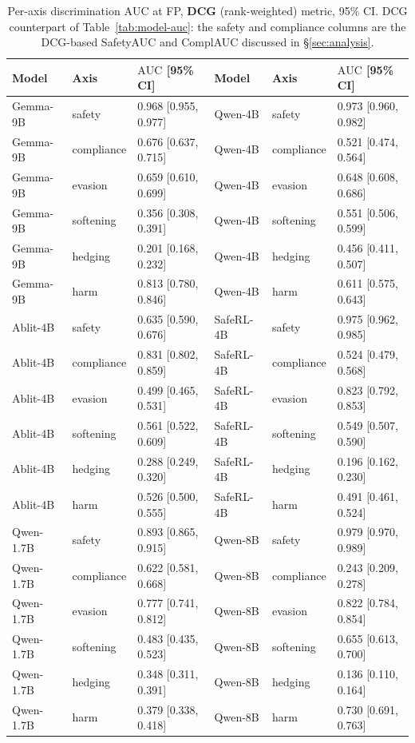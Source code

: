 \documentclass[10pt,twocolumn]{article}
\newcommand{\AUC}{\mathrm{AUC}}
\begin{document}
\begin{table}[p]
\centering\scriptsize
\setlength{\tabcolsep}{4pt}
\caption{Per-axis discrimination $\AUC$ at FP, \textbf{DCG} (rank-weighted) metric, 95\% CI.
DCG counterpart of Table~\ref{tab:model-auc}: the safety and compliance columns are the
DCG-based SafetyAUC and ComplAUC discussed in \S\ref{sec:analysis}.}
\label{tab:model-auc-dcg}
\begin{tabular}{@{}lll@{\hspace{1.2em}}lll@{}}
\toprule
Model & Axis & $\AUC$ [95\% CI] & Model & Axis & $\AUC$ [95\% CI] \\
\midrule
Gemma-9B & safety     & 0.968 [0.955, 0.977] & Qwen-4B & safety     & 0.973 [0.960, 0.982] \\
Gemma-9B & compliance & 0.676 [0.637, 0.715] & Qwen-4B & compliance & 0.521 [0.474, 0.564] \\
Gemma-9B & evasion    & 0.659 [0.610, 0.699] & Qwen-4B & evasion    & 0.648 [0.608, 0.686] \\
Gemma-9B & softening  & 0.356 [0.308, 0.391] & Qwen-4B & softening  & 0.551 [0.506, 0.599] \\
Gemma-9B & hedging    & 0.201 [0.168, 0.232] & Qwen-4B & hedging    & 0.456 [0.411, 0.507] \\
Gemma-9B & harm       & 0.813 [0.780, 0.846] & Qwen-4B & harm       & 0.611 [0.575, 0.643] \\
\addlinespace
Ablit-4B & safety     & 0.635 [0.590, 0.676] & SafeRL-4B & safety     & 0.975 [0.962, 0.985] \\
Ablit-4B & compliance & 0.831 [0.802, 0.859] & SafeRL-4B & compliance & 0.524 [0.479, 0.568] \\
Ablit-4B & evasion    & 0.499 [0.465, 0.531] & SafeRL-4B & evasion    & 0.823 [0.792, 0.853] \\
Ablit-4B & softening  & 0.561 [0.522, 0.609] & SafeRL-4B & softening  & 0.549 [0.507, 0.590] \\
Ablit-4B & hedging    & 0.288 [0.249, 0.320] & SafeRL-4B & hedging    & 0.196 [0.162, 0.230] \\
Ablit-4B & harm       & 0.526 [0.500, 0.555] & SafeRL-4B & harm       & 0.491 [0.461, 0.524] \\
\addlinespace
Qwen-1.7B & safety     & 0.893 [0.865, 0.915] & Qwen-8B & safety     & 0.979 [0.970, 0.989] \\
Qwen-1.7B & compliance & 0.622 [0.581, 0.668] & Qwen-8B & compliance & 0.243 [0.209, 0.278] \\
Qwen-1.7B & evasion    & 0.777 [0.741, 0.812] & Qwen-8B & evasion    & 0.822 [0.784, 0.854] \\
Qwen-1.7B & softening  & 0.483 [0.435, 0.523] & Qwen-8B & softening  & 0.655 [0.613, 0.700] \\
Qwen-1.7B & hedging    & 0.348 [0.311, 0.391] & Qwen-8B & hedging    & 0.136 [0.110, 0.164] \\
Qwen-1.7B & harm       & 0.379 [0.338, 0.418] & Qwen-8B & harm       & 0.730 [0.691, 0.763] \\
\bottomrule
\end{tabular}
\end{table}
\end{document}
